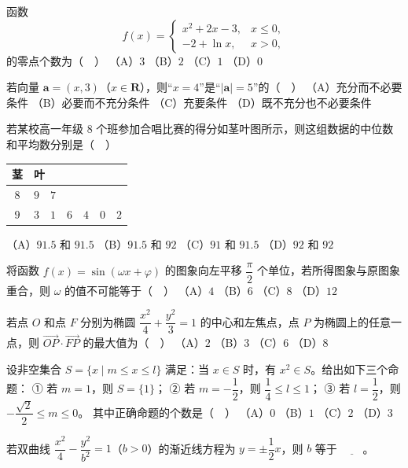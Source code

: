\endgroup
\begin{question}
函数
\nopagebreak[4]
\[f(x)=\begin{cases}x^2+2x-3,&x\leqslant0,\\-2+\ln x,&x>0,\end{cases}\]
的零点个数为（　）
（A）$3$
（B）$2$
（C）$1$
（D）$0$
\end{question}
\begin{question}
若向量 $\boldsymbol a=(x,3)$（$x\in\mathbf R$），则“$x=4$”是“$|\boldsymbol a|=5$”的（　）
（A）充分而不必要条件
（B）必要而不充分条件
（C）充要条件
（D）既不充分也不必要条件
\end{question}
\begin{question}
若某校高一年级 $8$ 个班参加合唱比赛的得分如茎叶图所示，则这组数据的中位数和平均数分别是（　）

\begin{center}
\begin{tabular}{cl}
\toprule
茎 & 叶 \\
\midrule
$8$ & $9\quad7$ \\
$9$ & $3\quad1\quad6\quad4\quad0\quad2$ \\
\bottomrule
\end{tabular}
\end{center}

（A）$91.5$ 和 $91.5$
（B）$91.5$ 和 $92$
（C）$91$ 和 $91.5$
（D）$92$ 和 $92$
\end{question}
\begin{question}
将函数 $f(x)=\sin(\omega x+\varphi)$ 的图象向左平移 $\dfrac{\pi}{2}$ 个单位，若所得图象与原图象重合，则 $\omega$ 的值不可能等于（　）
（A）$4$
（B）$6$
（C）$8$
（D）$12$
\end{question}
\begin{question}
若点 $O$ 和点 $F$ 分别为椭圆 $\dfrac{x^2}{4}+\dfrac{y^2}{3}=1$ 的中心和左焦点，点 $P$ 为椭圆上的任意一点，则 $\overrightarrow{OP}\cdot\overrightarrow{FP}$ 的最大值为（　）
（A）$2$
（B）$3$
（C）$6$
（D）$8$
\end{question}
\begin{question}
设非空集合 $S=\{x\mid m\leqslant x\leqslant l\}$ 满足：当 $x\in S$ 时，有 $x^2\in S$。给出如下三个命题：
① 若 $m=1$，则 $S=\{1\}$；
② 若 $m=-\dfrac12$，则 $\dfrac14\leqslant l\leqslant1$；
③ 若 $l=\dfrac12$，则 $-\dfrac{\sqrt2}{2}\leqslant m\leqslant0$。
其中正确命题的个数是（　）
（A）$0$
（B）$1$
（C）$2$
（D）$3$
\end{question}
\begin{question}
若双曲线 $\dfrac{x^2}{4}-\dfrac{y^2}{b^2}=1$（$b>0$）的渐近线方程为 $y=\pm\dfrac12x$，则 $b$ 等于 $\underline{\qquad}$。
\end{question}

